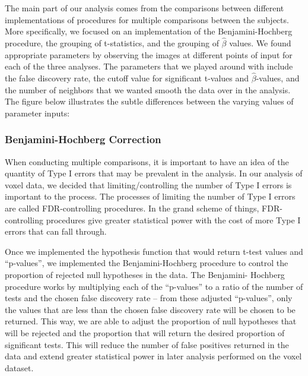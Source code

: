 \par The main part of our analysis comes from the comparisons between different 
implementations of procedures for multiple comparisons between the subjects.
More specifically, we focused on an implementation of the Benjamini-Hochberg 
procedure, the grouping of t-statistics, and the grouping of $\hat{\beta}$ 
values. We found appropriate parameters by observing the images at different 
points of input for each of the three analyses. The parameters that we played 
around with include the false discovery rate, the cutoff value for significant 
t-values and $\hat{\beta}$-values, and the number of neighbors that we wanted 
smooth the data over in the analysis. The figure below illustrates the subtle
differences between the varying values of parameter inputs:



\subsubsection{Benjamini-Hochberg Correction}

\par When conducting multiple comparisons, it is important to have an 
idea of the quantity of Type I errors that may be prevalent in the analysis. 
In our analysis of voxel data, we decided that limiting/controlling the number 
of Type I errors is important to the process. The processes of limiting the 
number of Type I errors are called FDR-controlling procedures. In the grand 
scheme of things, FDR-controlling procedures give greater statistical power 
with the cost of more Type I errors that can fall through. 

\par Once we implemented the hypothesis function that would return t-test 
values and ``p-values'', we implemented the Benjamini-Hochberg procedure to 
control the proportion of rejected null hypotheses in the data. The Benjamini-
Hochberg procedure works by multiplying each of the ``p-values'' to a ratio of 
the number of tests and the chosen false discovery rate -- from these adjusted 
``p-values'', only the values that are less than the chosen false discovery 
rate will be chosen to be returned. This way, we are able to adjust the 
proportion of null hypotheses that will be rejected and the proportion that 
will return the desired proportion of significant tests. This will reduce the
number of false positives returned in the data and extend greater statistical 
power in later analysis performed on the voxel dataset.

